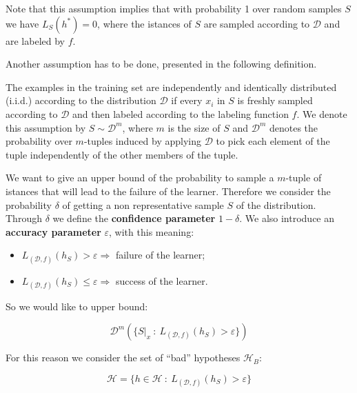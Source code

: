 \documentclass[../../main/main.tex]{subfiles}
\begin{document}
Note that this assumption implies that with probability 1 over random samples \( S \) we have \( L_S (h^*) = 0 \), where the istances of \( S \) are sampled according to \( \mathcal{D} \) and are labeled by \( f \).

Another assumption has to be done, presented in the following definition.

\begin{definition}
    The examples in the training set are independently and identically distributed (i.i.d.) according to the distribution \( \mathcal{D} \) if every \( x_i \) in \( S \) is freshly sampled according to \( \mathcal{D} \) and then labeled according to the labeling function \( f \). We denote this assumption by \( S \sim \mathcal{D}^m \), where \( m \) is the size of \( S \) and \( \mathcal{D}^m \) denotes the probability over \( m \)-tuples induced by applying \( \mathcal{D} \) to pick each element of the tuple independently of the other members of the tuple.
\end{definition}

We want to give an upper bound of the probability to sample a \( m \)-tuple of istances that will lead to the failure of the learner. Therefore we consider the probability \( \delta \) of getting a non representative sample \( S \) of the distribution. Through \( \delta \) we define the \textbf{confidence parameter} \( 1 - \delta \). We also introduce an \textbf{accuracy parameter} \( \varepsilon \), with this meaning:
\begin{itemize}
    \item \( L_{(\mathcal{D},f)}(h_S) > \varepsilon \Longrightarrow \) failure of the learner;
    \item \( L_{(\mathcal{D},f)}(h_S) \le \varepsilon \Longrightarrow \) success of the learner.
\end{itemize}

So we would like to upper bound:

\begin{equation}
    \mathcal{D}^m (\{ S|_x \ : \ L_{(\mathcal{D},f)}(h_S) > \varepsilon \})
    \label{eq:C1_DUB}
\end{equation}

For this reason we consider the set of ``bad'' hypotheses \( \mathcal{H}_B \):

\begin{equation}
    \mathcal{H} = \{ h \in \mathcal{H} \ : \ L_{(\mathcal{D},f)}(h_S) > \varepsilon \}
    \label{eq:C1_BH}
\end{equation}
\end{document}
